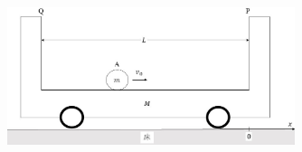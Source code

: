 \begin{figure}[htbp]
  \centering
  \includegraphics[width=0.75\textwidth]{../graphs/jumon_42.jpg}
  \caption{}
\end{figure}

